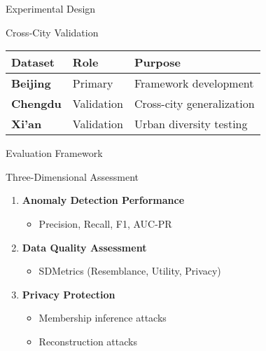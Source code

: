 \documentclass[aspectratio=169,xcolor={dvipsnames}]{beamer}
\begin{document}
\begin{frame}{Experimental Design}
  \begin{block}{Cross-City Validation}
    \begin{table}[h]
      \centering
      \begin{tabular}{lll}
        \toprule
        \textbf{Dataset} & \textbf{Role} & \textbf{Purpose} \\
        \midrule
        \textbf{Beijing} & Primary & Framework development \\
        \textbf{Chengdu} & Validation & Cross-city generalization \\
        \textbf{Xi'an} & Validation & Urban diversity testing \\
        \bottomrule
      \end{tabular}
    \end{table}
  \end{block}
\end{frame}

\begin{frame}{Evaluation Framework}
  \begin{block}{Three-Dimensional Assessment}
    \begin{enumerate}
      \item \textbf{Anomaly Detection Performance}
      \begin{itemize}
        \item Precision, Recall, F1, AUC-PR
      \end{itemize}
      
      \item \textbf{Data Quality Assessment}
      \begin{itemize}
        \item SDMetrics (Resemblance, Utility, Privacy)
      \end{itemize}
      
      \item \textbf{Privacy Protection}
      \begin{itemize}
        \item Membership inference attacks
        \item Reconstruction attacks
      \end{itemize}
    \end{enumerate}
  \end{block}
\end{frame}
\end{document}
